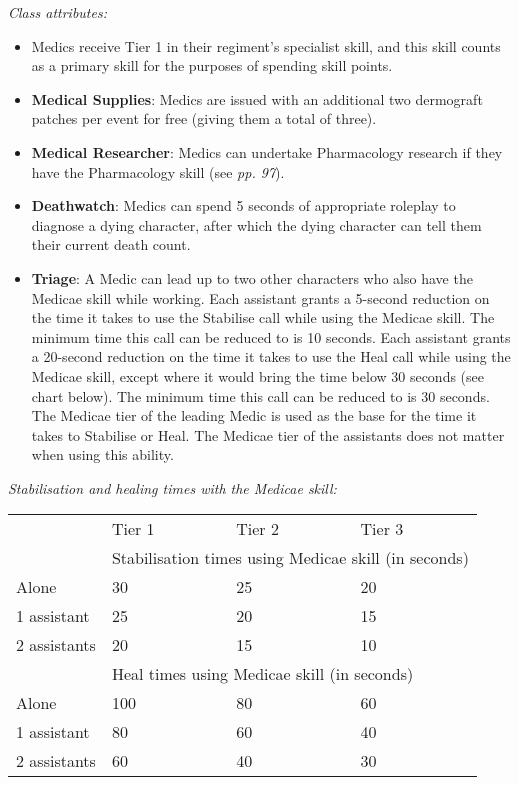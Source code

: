 \documentclass{scrbook}
\begin{document}
\textit{Class attributes:}

\begin{itemize}
\item Medics receive Tier 1 in their regiment's specialist skill, and this skill counts as a primary skill for the purposes of spending skill points.

\item \textbf{Medical Supplies}: Medics are issued with an additional two dermograft patches per event for free (giving them a total of three).

\item \textbf{Medical Researcher}: Medics can undertake Pharmacology research if they have the Pharmacology skill (see \textit{pp. 97}).

\item \textbf{Deathwatch}: Medics can spend 5 seconds of appropriate roleplay to diagnose a dying character, after which the dying character can tell them their current death count.

\item \textbf{Triage}: A Medic can lead up to two other characters who also have the Medicae skill while working. Each assistant grants a 5-second reduction on the time it takes to use the Stabilise call while using the Medicae skill. The minimum time this call can be reduced to is 10 seconds. Each assistant grants a 20-second reduction on the time it takes to use the Heal call while using the Medicae skill, except where it would bring the time below 30 seconds (see chart below). The minimum time this call can be reduced to is 30 seconds. The Medicae tier of the leading Medic is used as the base for the time it takes to Stabilise or Heal. The Medicae tier of the assistants does not matter when using this ability.

\end{itemize}
\textit{Stabilisation and healing times with the Medicae skill:}

\begin{table}
\begin{tabular}{|l|l|l|l|} \hline 
\multirow{1}{*}{}& Tier 1 & Tier 2 & Tier 3 \\
\cline{2-2}\cline{3-3}\cline{4-4} & \multicolumn{3}{|l|}{Stabilisation times using Medicae skill (in seconds)} \\
 \hline Alone & 30 & 25 & 20 \\
 \hline 1 assistant & 25 & 20 & 15 \\
 \hline 2 assistants & 20 & 15 & 10 \\
 \hline  & \multicolumn{3}{|l|}{Heal times using Medicae skill (in seconds)} \\
 \hline Alone & 100 & 80 & 60 \\
 \hline 1 assistant & 80 & 60 & 40 \\
 \hline 2 assistants & 60 & 40 & 30 \\
 \hline \end{tabular}

\end{table}
\end{document}
